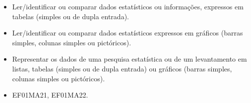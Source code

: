 

\begin{itemize}
\item Ler/identificar ou comparar dados estatísticos ou informações, expressos em tabelas (simples ou de dupla entrada).

\item Ler/identificar ou comparar dados estatísticos expressos em gráficos (barras simples, colunas simples ou pictóricos).

\item Representar os dados de uma pesquisa estatística ou de um levantamento
em listas, tabelas (simples ou de dupla entrada) ou gráficos (barras
simples, colunas simples ou pictóricos).
\end{itemize}


\begin{itemize}
	\item EF01MA21, EF01MA22.
\end{itemize}

